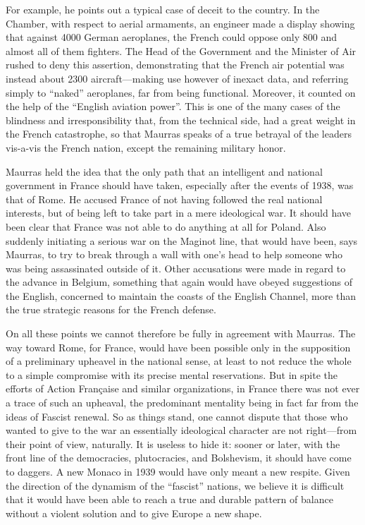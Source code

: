 For example, he points out a typical case of deceit to the country. In the Chamber, with respect to aerial armaments, an engineer made a display showing that against 4000 German aeroplanes, the French could oppose only 800 and almost all of them fighters. The Head of the Government and the Minister of Air rushed to deny this assertion, demonstrating that the French air potential was instead about 2300 aircraft---making use however of inexact data, and referring simply to ``naked'' aeroplanes, far from being functional. Moreover, it counted on the help of the ``English aviation power''. This is one of the many cases of the blindness and irresponsibility that, from the technical side, had a great weight in the French catastrophe, so that Maurras speaks of a true betrayal of the leaders vis-a-vis the French nation, except the remaining military honor.

Maurras held the idea that the only path that an intelligent and national government in France should have taken, especially after the events of 1938, was that of Rome. He accused France of not having followed the real national interests, but of being left to take part in a mere ideological war. It should have been clear that France was not able to do anything at all for Poland. Also suddenly initiating a serious war on the Maginot line, that would have been, says Maurras, to try to break through a wall with one's head to help someone who was being assassinated outside of it. Other accusations were made in regard to the advance in Belgium, something that again would have obeyed suggestions of the English, concerned to maintain the coasts of the English Channel, more than the true strategic reasons for the French defense.

On all these points we cannot therefore be fully in agreement with Maurras. The way toward Rome, for France, would have been possible only in the supposition of a preliminary upheavel in the national sense, at least to not reduce the whole to a simple compromise with its precise mental reservations. But in spite the efforts of Action Française and similar organizations, in France there was not ever a trace of such an upheaval, the predominant mentality being in fact far from the ideas of Fascist renewal. So as things stand, one cannot dispute that those who wanted to give to the war an essentially ideological character are not right---from their point of view, naturally. It is useless to hide it: sooner or later, with the front line of the democracies, plutocracies, and Bolshevism, it should have come to daggers. A new Monaco in 1939 would have only meant a new respite. Given the direction of the dynamism of the ``fascist'' nations, we believe it is difficult that it would have been able to reach a true and durable pattern of balance without a violent solution and to give Europe a new shape.

